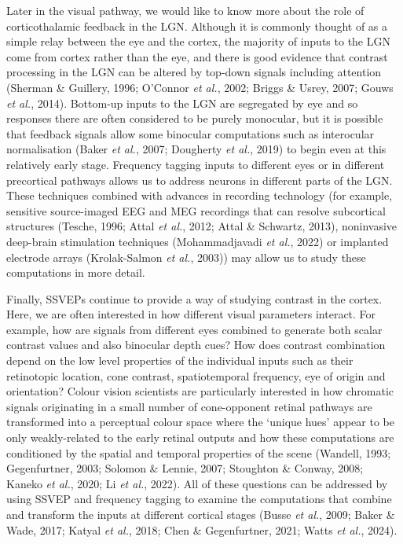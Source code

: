 \documentclass[
  letterpaper,
  DIV=11,
  numbers=noendperiod]{scrartcl}
\begin{document}
Later in the visual pathway, we would like to know more about the role
of corticothalamic feedback in the LGN. Although it is commonly thought
of as a simple relay between the eye and the cortex, the majority of
inputs to the LGN come from cortex rather than the eye, and there is
good evidence that contrast processing in the LGN can be altered by
top-down signals including attention (Sherman \& Guillery, 1996;
O'Connor \emph{et al.}, 2002; Briggs \& Usrey, 2007; Gouws \emph{et
al.}, 2014). Bottom-up inputs to the LGN are segregated by eye and so
responses there are often considered to be purely monocular, but it is
possible that feedback signals allow some binocular computations such as
interocular normalisation (Baker \emph{et al.}, 2007; Dougherty \emph{et
al.}, 2019) to begin even at this relatively early stage. Frequency
tagging inputs to different eyes or in different precortical pathways
allows us to address neurons in different parts of the LGN. These
techniques combined with advances in recording technology (for example,
sensitive source-imaged EEG and MEG recordings that can resolve
subcortical structures (Tesche, 1996; Attal \emph{et al.}, 2012; Attal
\& Schwartz, 2013), noninvasive deep-brain stimulation techniques
(Mohammadjavadi \emph{et al.}, 2022) or implanted electrode arrays
(Krolak-Salmon \emph{et al.}, 2003)) may allow us to study these
computations in more detail.

Finally, SSVEPs continue to provide a way of studying contrast in the
cortex. Here, we are often interested in how different visual parameters
interact. For example, how are signals from different eyes combined to
generate both scalar contrast values and also binocular depth cues? How
does contrast combination depend on the low level properties of the
individual inputs such as their retinotopic location, cone contrast,
spatiotemporal frequency, eye of origin and orientation? Colour vision
scientists are particularly interested in how chromatic signals
originating in a small number of cone-opponent retinal pathways are
transformed into a perceptual colour space where the `unique hues'
appear to be only weakly-related to the early retinal outputs and how
these computations are conditioned by the spatial and temporal
properties of the scene (Wandell, 1993; Gegenfurtner, 2003; Solomon \&
Lennie, 2007; Stoughton \& Conway, 2008; Kaneko \emph{et al.}, 2020; Li
\emph{et al.}, 2022). All of these questions can be addressed by using
SSVEP and frequency tagging to examine the computations that combine and
transform the inputs at different cortical stages (Busse \emph{et al.},
2009; Baker \& Wade, 2017; Katyal \emph{et al.}, 2018; Chen \&
Gegenfurtner, 2021; Watts \emph{et al.}, 2024).
\end{document}
